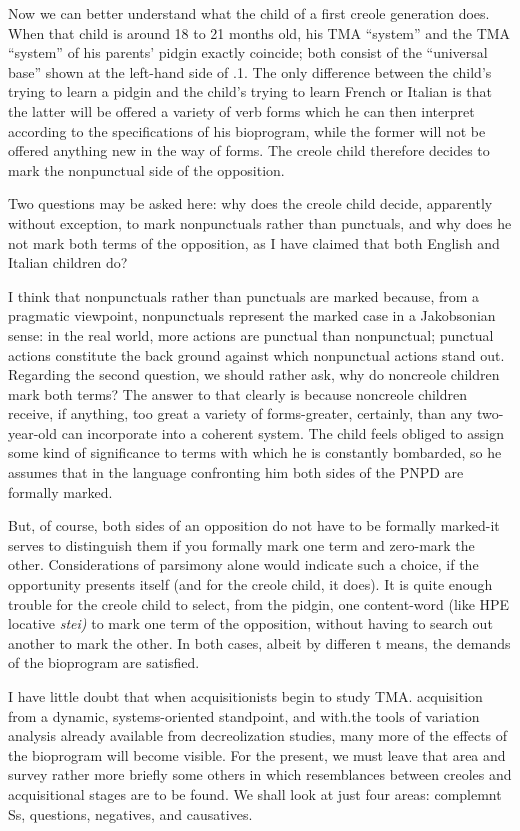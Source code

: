 Now we can better understand what the child of a first creole generation does. When that child is around 18 to 21 months old, his TMA ``system'' and the TMA ``system'' of his parents' pidgin exactly coincide; both consist of the ``universal base'' shown at the left-hand side of .1. The only difference between the child's trying to learn a pidgin and the child's trying to learn French or Italian is that the latter will be offered a variety of verb forms which he can then interpret according to the specifications of his bioprogram, while the former will not be offered anything new in the way of forms. The creole child therefore decides to mark the nonpunctual side of the opposition.

Two questions may be asked here: why does the creole child decide, apparently without exception, to mark nonpunctuals rather than punctuals, and why does he not mark both terms of the opposi\-tion, as I have claimed that both English and Italian children do?

I think that nonpunctuals rather than punctuals are marked because, from a pragmatic viewpoint, nonpunctuals represent the marked case in a Jakobsonian sense: in the real world, more actions are punctual than nonpunctual; punctual actions constitute the back%
ground against which nonpunctual actions stand out. Regarding the second question, we should rather ask, why do noncreole children mark both terms? The answer to that clearly is because noncreole children receive, if anything, too great a variety of forms-greater, certainly, than any two-year-old can incorporate into a coherent system. The child feels obliged to assign some kind of significance to terms with which he is constantly bombarded, so he assumes that in the language confronting him both sides of the PNPD are formally marked.

But, of course, both sides of an opposition do not have to be formally marked-it serves to distinguish them if you formally mark one term and zero-mark the other. Considerations of parsimony alone would indicate such a choice, if the opportunity presents itself (and for the creole child, it does). It is quite enough trouble for the creole child
to select, from the pidgin, one content-word (like HPE locative \textit{stei)}
to mark one term of the opposition, without having to search out another to mark the other. In both cases, albeit by differen t means, the demands of the bioprogram are satisfied.

I have little doubt that when acquisitionists begin to study TMA. acquisition from a dynamic, systems-oriented standpoint, and with.the tools of variation analysis already available from decreolization studies, many more of the effects of the bioprogram will become visible. For the present, we must leave that area and survey rather more briefly some others in which resemblances between creoles and acqui\-sitional stages are to be found. We shall look at just four areas: comple\-mnt Ss, questions, negatives, and causatives.

